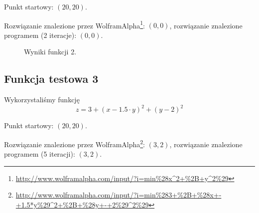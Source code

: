 \documentclass{classrep}
\begin{document}
Punkt startowy: $(20, 20)$.

Rozwiązanie znalezione przez WolframAlpha\footnote{\url{http://www.wolframalpha.com/input/?i=min\%28x^2+\%2B+y^2\%29}}: $(0, 0)$, rozwiązanie znalezione programem (2 iteracje): $(0, 0)$.

\begin{figure}
\noindent{}
\caption{Wyniki funkcji 2.}
\end{figure}

\subsection{Funkcja testowa 3}
Wykorzystaliśmy funkcję
\begin{equation}
  z = 3 + (x - 1.5 \cdot y)^2 + (y - 2)^2
\end{equation}

Punkt startowy: $(20, 20)$.

Rozwiązanie znalezione przez WolframAlpha\footnote{\url{http://www.wolframalpha.com/input/?i=min\%283+\%2B+\%28x+-+1.5*y\%29^2+\%2B+\%28y+-+2\%29^2\%29}}: $(3, 2)$, rozwiązanie znalezione programem (5 iteracji): $(3, 2)$.
\end{document}
